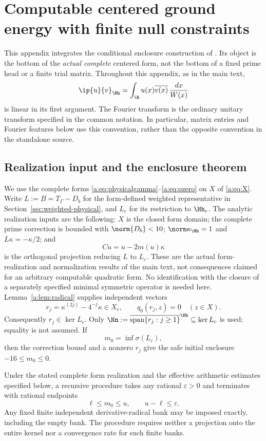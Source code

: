 \section{Computable centered ground energy with finite null constraints}
\label{vfourC:section}

This appendix integrates the conditional enclosure construction of
\cite{vfourComputable}.  Its object is the bottom of the \emph{actual complete}
centered form, not the bottom of a fixed prime head or a finite trial matrix.
Throughout this appendix, as in the main text,
\[
 \ip{u}{v}_{\Hh}=\int_{\R}u(x)\overline{v(x)}\,\frac{dx}{W(x)}
\]
is linear in its first argument.  The Fourier transform is the ordinary unitary
transform specified in the common notation.  In particular, matrix entries and
Fourier features below use this convention, rather than the opposite convention
in the standalone source.

\subsection{Realization input and the enclosure theorem}
\label{vfourC:subsec:input}

We use the complete forms \eqref{a:eq:physicalgamma}--\eqref{a:eq:qzero} on
$X$ of \eqref{a:eq:X}.  Write $L:=B=T_\Gamma-D_b$ for the form-defined weighted
representative in Section~\ref{sec:weighted-physical}, and $L_c$ for its
restriction to $\Hh_c$.  The analytic realization inputs are the following:
$X$ is the closed form domain; the complete prime correction is bounded with
$\norm{D_b}<10$; $\norm\kappa_{\Hh}=1$ and $L\kappa=-\kappa/2$; and
\[
 Cu=u-2m(u)\kappa
\]
is the orthogonal projection reducing $L$ to $L_c$.  These are the actual
form-realization and normalization results of the main text, not consequences
claimed for an arbitrary computable quadratic form.  No identification with the
closure of a separately specified minimal symmetric operator is needed here.
Lemma~\ref{a:lem:radical} supplies independent vectors
\[
 r_j=\kappa^{(2j)}-4^{-j}\kappa\in X_c,
 \qquad q_0(r_j,z)=0\quad(z\in X).
\]
Consequently $r_j\in\ker L_c$.  Only
$\Nn:=\overline{\operatorname{span}\{r_j:j\ge1\}}^{\Hh}
\subseteq\ker L_c$ is used; equality is not assumed.  If
\begin{equation}\label{vfourC:eq:mzero}
 m_0=\inf\sigma(L_c),
\end{equation}
then the correction bound and a nonzero $r_j$ give the safe initial enclosure
$-16\le m_0\le0$.

\begin{theorem}
\label{vfourC:thm:computable}
Under the stated complete form realization and the effective arithmetic
estimates specified below, a recursive procedure takes any rational
$\varepsilon>0$ and terminates with rational endpoints
\[
 \ell\le m_0\le u,\qquad u-\ell\le\varepsilon.
\]
Any fixed finite independent derivative-radical bank may be imposed exactly,
including the empty bank.  The procedure requires neither a projection onto the
entire kernel nor a convergence rate for such finite banks.
\end{theorem}

